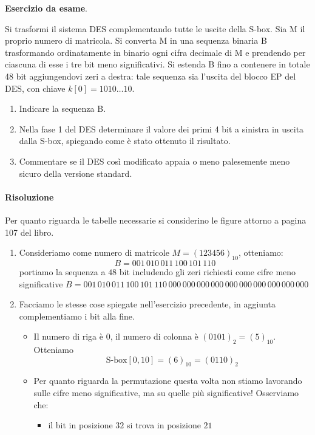 \begin{framed}
	\noindent \textbf{Esercizio da esame}.
	
	\noindent Si trasformi il sistema DES complementando tutte le uscite della S-box.
	Sia M il proprio numero di matricola. Si converta M in una sequenza binaria B trasformando
	ordinatamente in binario ogni cifra decimale di M e prendendo per ciascuna di esse i tre bit meno
	significativi. Si estenda B fino a contenere in totale 48 bit aggiungendovi zeri a destra: tale
	sequenza sia l’uscita del blocco EP del DES, con chiave $k[0] =1010\dots10$. 
	\begin{enumerate}
		\item Indicare la sequenza B.
		\item Nella fase 1 del DES determinare il valore dei primi 4 bit a sinistra in uscita dalla S-box,
		spiegando come è stato ottenuto il risultato.
		\item Commentare se il DES così modificato appaia o meno palesemente meno sicuro della versione
		standard.
	\end{enumerate}
	
	\paragraph{Risoluzione} Per quanto riguarda le tabelle necessarie si considerino le figure attorno a pagina 107 del libro.
	
	\begin{enumerate}
		\item Consideriamo come numero di matricole $M=(123456)_{10}$, otteniamo:
		$$B=001\,010\,011\,100\,101\,110$$
		portiamo la sequenza a $48$ bit includendo gli zeri richiesti come cifre meno significative
		$B=001\,010\,011\,100\,101\,110\,000\,000\,000\,000\,000\,000\,000\,000\,000\,000$
		\item Facciamo le stesse cose spiegate nell'esercizio precedente, in aggiunta complementiamo i bit alla fine.
		\begin{itemize}
			\item Il numero di riga è $0$, il numero di colonna è $(0101)_2=(5)_{10}$. Otteniamo
			$$\text{S-box}[0,10]=(6)_{10}=(0110)_2$$
			\item Per quanto riguarda la permutazione questa volta non stiamo lavorando sulle cifre meno significative, ma su quelle più significative! Osserviamo che:
			\begin{itemize}
				\item  il bit in posizione $32$ si trova in posizione $21$
				

\end{itemize}
\end{itemize}
\end{enumerate}
\end{framed}
